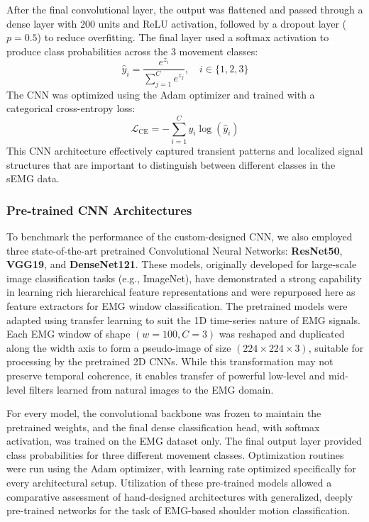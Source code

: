 \documentclass{elektr}
\begin{document}
After the final convolutional layer, the output was flattened and passed through a dense layer with 200 units and ReLU activation, followed by a dropout layer ($p=0.5$) to reduce overfitting. The final layer used a softmax activation to produce class probabilities across the 3 movement classes:
\begin{equation}
	\hat{y}_i = \frac{e^{z_i}}{\sum_{j=1}^C e^{z_j}}, \quad i \in \{1, 2, 3\}
\end{equation}
The CNN was optimized using the Adam optimizer and trained with a categorical cross-entropy loss:
\begin{equation}
	\mathcal{L}_{\text{CE}} = -\sum_{i=1}^{C} y_i \log(\hat{y}_i)
\end{equation}
This CNN architecture effectively captured transient patterns and localized signal structures that are important to distinguish between different classes in the sEMG data.
\subsubsection{Pre-trained CNN Architectures}
To benchmark the performance of the custom-designed CNN, we also employed three state-of-the-art pretrained Convolutional Neural Networks: \textbf{ResNet50}, \textbf{VGG19}, and \textbf{DenseNet121}. These models, originally developed for large-scale image classification tasks (e.g., ImageNet), have demonstrated a strong capability in learning rich hierarchical feature representations and were repurposed here as feature extractors for EMG window classification. The pretrained models were adapted using transfer learning to suit the 1D time-series nature of EMG signals.
Each EMG window of shape $(w = 100, C = 3)$ was reshaped and duplicated along the width axis to form a pseudo-image of size $(224 \times 224 \times 3)$, suitable for processing by the pretrained 2D CNNs. While this transformation may not preserve temporal coherence, it enables transfer of powerful low-level and mid-level filters learned from natural images to the EMG domain.


For every model, the convolutional backbone was frozen to maintain the pretrained weights, and the final dense classification head, with softmax activation, was trained on the EMG dataset only. The final output layer provided class probabilities for three different movement classes. Optimization routines were run using the Adam optimizer, with learning rate optimized specifically for every architectural setup. Utilization of these pre-trained models allowed a comparative assessment of hand-designed architectures with generalized, deeply pre-trained networks for the task of EMG-based shoulder motion classification.
\end{document}
